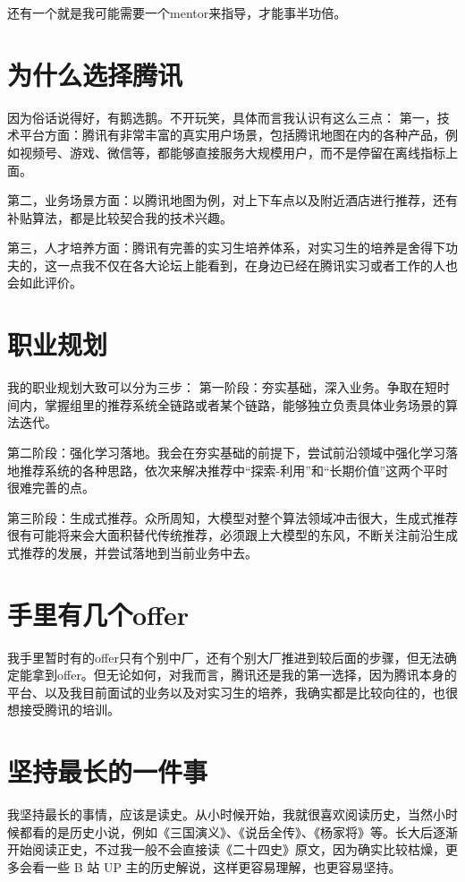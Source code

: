\documentclass[12pt,a4paper]{article}
\begin{document}
还有一个就是我可能需要一个mentor来指导，才能事半功倍。

\section{为什么选择腾讯}
因为俗话说得好，有鹅选鹅。不开玩笑，具体而言我认识有这么三点：
第一，技术平台方面：腾讯有非常丰富的真实用户场景，包括腾讯地图在内的各种产品，例如视频号、游戏、微信等，都能够直接服务大规模用户，而不是停留在离线指标上面。

第二，业务场景方面：以腾讯地图为例，对上下车点以及附近酒店进行推荐，还有补贴算法，都是比较契合我的技术兴趣。

第三，人才培养方面：腾讯有完善的实习生培养体系，对实习生的培养是舍得下功夫的，这一点我不仅在各大论坛上能看到，在身边已经在腾讯实习或者工作的人也会如此评价。

\section{职业规划}
我的职业规划大致可以分为三步：
第一阶段：夯实基础，深入业务。争取在短时间内，掌握组里的推荐系统全链路或者某个链路，能够独立负责具体业务场景的算法迭代。

第二阶段：强化学习落地。我会在夯实基础的前提下，尝试前沿领域中强化学习落地推荐系统的各种思路，依次来解决推荐中“探索-利用”和“长期价值”这两个平时很难完善的点。

第三阶段：生成式推荐。众所周知，大模型对整个算法领域冲击很大，生成式推荐很有可能将来会大面积替代传统推荐，必须跟上大模型的东风，不断关注前沿生成式推荐的发展，并尝试落地到当前业务中去。

\section{手里有几个offer}
我手里暂时有的offer只有个别中厂，还有个别大厂推进到较后面的步骤，但无法确定能拿到offer。但无论如何，对我而言，腾讯还是我的第一选择，因为腾讯本身的平台、以及我目前面试的业务以及对实习生的培养，我确实都是比较向往的，也很想接受腾讯的培训。

\section{坚持最长的一件事}
我坚持最长的事情，应该是读史。从小时候开始，我就很喜欢阅读历史，当然小时候都看的是历史小说，例如《三国演义》、《说岳全传》、《杨家将》等。长大后逐渐开始阅读正史，不过我一般不会直接读《二十四史》原文，因为确实比较枯燥，更多会看一些 B 站 UP 主的历史解说，这样更容易理解，也更容易坚持。
\end{document}
